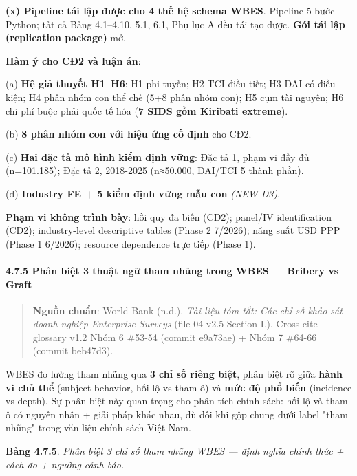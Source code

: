\documentclass[12pt,a4paper]{article}
\begin{document}
\textbf{(x) Pipeline tái lập được cho 4 thế hệ schema WBES}. Pipeline 5
bước Python; tất cả Bảng 4.1--4.10, 5.1, 6.1, Phụ lục A đều tái tạo
được. \textbf{Gói tái lập (replication package)} mở.

\textbf{Hàm ý cho CĐ2 và luận án}:

(a) \textbf{Hệ giả thuyết H1--H6}: H1 phi tuyến; H2 TCI điều tiết; H3
DAI có điều kiện; H4 phân nhóm con thể chế (5+8 phân nhóm con); H5 cụm
tài nguyên; H6 chi phí buộc phải quốc tế hóa (\textbf{7 SIDS gồm
Kiribati extreme}).

(b) \textbf{8 phân nhóm con với hiệu ứng cố định} cho CĐ2.

(c) \textbf{Hai đặc tả mô hình kiểm định vững}: Đặc tả 1, phạm vi đầy đủ
(n=101.185); Đặc tả 2, 2018-2025 (n≈50.000, DAI/TCI 5 thành phần).

(d) \textbf{Industry FE + 5 kiểm định vững mẫu con} \emph{(NEW D3)}.

\textbf{Phạm vi không trình bày}: hồi quy đa biến (CĐ2); panel/IV
identification (CĐ2); industry-level descriptive tables (Phase 2
7/2026); năng suất USD PPP (Phase 1 6/2026); resource dependence trực
tiếp (Phase 1).

\hypertarget{475-phuxe2n-biux1ec7t-3-thuux1eadt-ngux1eef-tham-nhux169ng-trong-wbes--bribery-vs-graft}{%
\paragraph{4.7.5 Phân biệt 3 thuật ngữ tham nhũng trong WBES --- Bribery
vs
Graft}\label{475-phuxe2n-biux1ec7t-3-thuux1eadt-ngux1eef-tham-nhux169ng-trong-wbes--bribery-vs-graft}}

\begin{quote}
\textbf{Nguồn chuẩn}: World Bank (n.d.). \emph{Tài liệu tóm tắt: Các chỉ
số khảo sát doanh nghiệp Enterprise Surveys} (file 04 v2.5 Section L).
Cross-cite glossary v1.2 Nhóm 6 \#53-54 (commit e9a73ae) + Nhóm 7
\#64-66 (commit beb47d3).
\end{quote}

WBES đo lường tham nhũng qua \textbf{3 chỉ số riêng biệt}, phân biệt rõ
giữa \textbf{hành vi chủ thể} (subject behavior, hối lộ vs tham ô) và
\textbf{mức độ phổ biến} (incidence vs depth). Sự phân biệt này quan
trọng cho phân tích chính sách: hối lộ và tham ô có nguyên nhân + giải
pháp khác nhau, dù đôi khi gộp chung dưới label "tham nhũng" trong văn
liệu chính sách Việt Nam.

\textbf{Bảng 4.7.5}. \emph{Phân biệt 3 chỉ số tham nhũng WBES --- định
nghĩa chính thức + cách đo + ngưỡng cảnh báo.}
\end{document}
